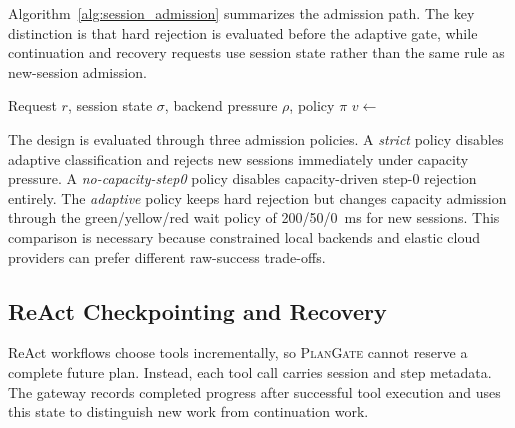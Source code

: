 \documentclass[5p,times]{elsarticle}
\newcommand{\plangate}{\textsc{PlanGate}\xspace}
\begin{document}
Algorithm~\ref{alg:session_admission} summarizes the admission path. The key distinction is that hard rejection is evaluated before the adaptive gate, while continuation and recovery requests use session state rather than the same rule as new-session admission.

\begin{algorithm}[t]
\caption{Session-aware admission and continuation}
\label{alg:session_admission}
\footnotesize
\begin{algorithmic}[1]
\Require Request $r$, session state $\sigma$, backend pressure $\rho$, policy $\pi$
  \State \Return {}
\EndIf
{}
  \State \Return {}
\EndIf
{}
    \State \Return {}
  \EndIf
  \State $v \gets$ 
    \State \Return {}
  \EndIf
  \State \Return {}
\EndIf
{}
  \State \Return {}
  \State \Return {}
  \State \Return {}
\Else
  \State \Return {}
\EndIf
\end{algorithmic}
\end{algorithm}

The design is evaluated through three admission policies. A \emph{strict} policy disables adaptive classification and rejects new sessions immediately under capacity pressure. A \emph{no-capacity-step0} policy disables capacity-driven step-0 rejection entirely. The \emph{adaptive} policy keeps hard rejection but changes capacity admission through the green/yellow/red wait policy of 200/50/0~ms for new sessions. This comparison is necessary because constrained local backends and elastic cloud providers can prefer different raw-success trade-offs.

\subsection{ReAct Checkpointing and Recovery}

ReAct workflows choose tools incrementally, so \plangate cannot reserve a complete future plan. Instead, each tool call carries session and step metadata. The gateway records completed progress after successful tool execution and uses this state to distinguish new work from continuation work.
\end{document}
